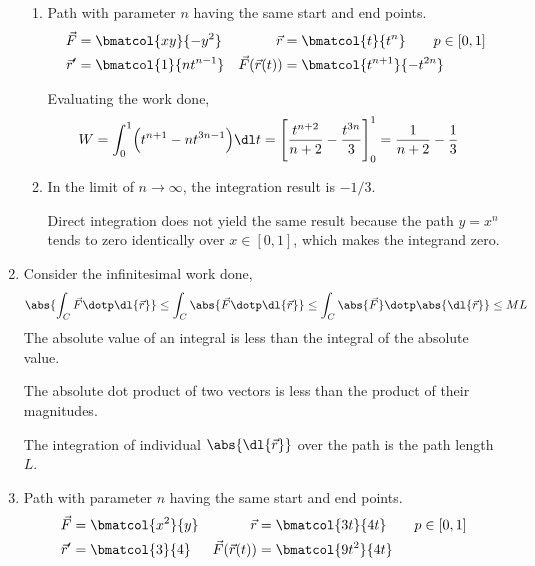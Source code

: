 \begin{enumerate}
\begin{enumerate}
              \item Path with parameter $ n $ having the same start and end points.
                    \begin{align}
                        \vec{F}             & = \bmatcol{xy}{-y^2}         &
                        \vec{r}             & =
                        \bmatcol{t}{t^n} \qquad p \in [0, 1]                 \\
                        \vec{r}'            & = \bmatcol{1}{n t^{n-1}}     &
                        \vec{F}(\vec{r}(t)) & = \bmatcol{t^{n+1}}{-t^{2n}}
                    \end{align}

                    Evaluating the work done,
                    \begin{align}
                        W & = \int_{0}^{1} \Bigl( t^{n+1} - nt^{3n-1}
                        \Bigr) \dl t = \Bigg[ \frac{t^{n+2}}{n+2}
                            - \frac{t^{3n}}{3} \Bigg]_0^1
                        = \frac{1}{n+2} - \frac{1}{3}
                    \end{align}

              \item In the limit of $ n \rightarrow \infty $, the integration result
                    is $ -1/3 $. \par
                    Direct integration does not yield the same result because the
                    path $ y = x^n $ tends to zero identically over $ x \in [0, 1] $,
                    which makes the integrand zero.
          \end{enumerate}

    \item Consider the infinitesimal work done,
          \begin{align}
              \abs{\int_{C} \vec{F} \dotp \dl{\vec{r}}} \leq
              \int_{C} \abs{\vec{F} \dotp \dl{\vec{r}}} \leq
              \int_{C} \abs{\vec{F}} \dotp \abs{\dl{\vec{r}}} \leq
              ML
          \end{align}
          The absolute value of an integral is less than the integral of the absolute
          value. \par
          The absolute dot product of two vectors is less than the product of their
          magnitudes. \par
          The integration of individual $ \abs{\dl{\vec{r}}} $ over the path is the
          path length $ L $.

    \item Path with parameter $ n $ having the same start and end points.
          \begin{align}
              \vec{F}             & = \bmatcol{x^2}{y}   &
              \vec{r}             & =
              \bmatcol{3t}{4t} \qquad p \in [0, 1]         \\
              \vec{r}'            & = \bmatcol{3}{4}     &
              \vec{F}(\vec{r}(t)) & = \bmatcol{9t^2}{4t}
          \end{align}


\end{enumerate}

